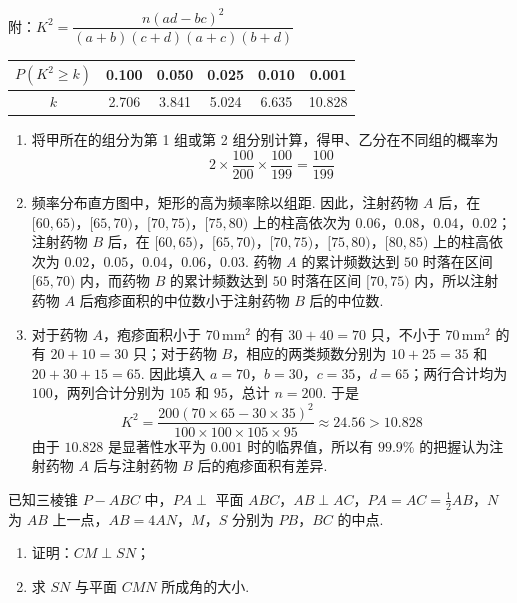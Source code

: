 \begin{problem}
附：\(K^2=\dfrac{n(ad-bc)^2}{(a+b)(c+d)(a+c)(b+d)}\)

\begin{center}
\begin{tabular}{|c|c|c|c|c|c|}
\hline
\(P(K^2\geqslant k)\) & 0.100 & 0.050 & 0.025 & 0.010 & 0.001 \\
\hline
\(k\) & 2.706 & 3.841 & 5.024 & 6.635 & 10.828 \\
\hline
\end{tabular}
\end{center}

\end{problem}

\begin{solution}
\begin{enumerate}
\item 将甲所在的组分为第 1 组或第 2 组分别计算，得甲、乙分在不同组的概率为
\[
2\times\frac{100}{200}\times\frac{100}{199}=\frac{100}{199}
\]
\item 频率分布直方图中，矩形的高为频率除以组距. 因此，注射药物 \(A\) 后，在 \([60,65)\)，\([65,70)\)，\([70,75)\)，\([75,80)\) 上的柱高依次为 \(0.06\)，\(0.08\)，\(0.04\)，\(0.02\)；注射药物 \(B\) 后，在 \([60,65)\)，\([65,70)\)，\([70,75)\)，\([75,80)\)，\([80,85)\) 上的柱高依次为 \(0.02\)，\(0.05\)，\(0.04\)，\(0.06\)，\(0.03\). 药物 \(A\) 的累计频数达到 \(50\) 时落在区间 \([65,70)\) 内，而药物 \(B\) 的累计频数达到 \(50\) 时落在区间 \([70,75)\) 内，所以注射药物 \(A\) 后疱疹面积的中位数小于注射药物 \(B\) 后的中位数.
\item 对于药物 \(A\)，疱疹面积小于 \(70\,\mathrm{mm}^2\) 的有 \(30+40=70\) 只，不小于 \(70\,\mathrm{mm}^2\) 的有 \(20+10=30\) 只；对于药物 \(B\)，相应的两类频数分别为 \(10+25=35\) 和 \(20+30+15=65\). 因此填入 \(a=70\)，\(b=30\)，\(c=35\)，\(d=65\)；两行合计均为 \(100\)，两列合计分别为 \(105\) 和 \(95\)，总计 \(n=200\). 于是
\[
K^2=\frac{200(70\times65-30\times35)^2}{100\times100\times105\times95}\approx24.56>10.828
\]
由于 \(10.828\) 是显著性水平为 \(0.001\) 时的临界值，所以有 \(99.9\%\) 的把握认为注射药物 \(A\) 后与注射药物 \(B\) 后的疱疹面积有差异.
\end{enumerate}
\end{solution}

\begin{problem}
已知三棱锥 \(P - ABC\) 中，\(PA \perp\) 平面 \(ABC\)，\(AB \perp AC\)，\(PA = AC = \frac{1}{2} AB\)，\(N\) 为 \(AB\) 上一点，\(AB = 4AN\)，\(M\)，\(S\) 分别为 \(PB\)，\(BC\) 的中点.

\begin{enumerate}
\item 证明：\(CM \perp SN\)；
\item 求 \(SN\) 与平面 \(CMN\) 所成角的大小.
\end{enumerate}

\end{problem}

